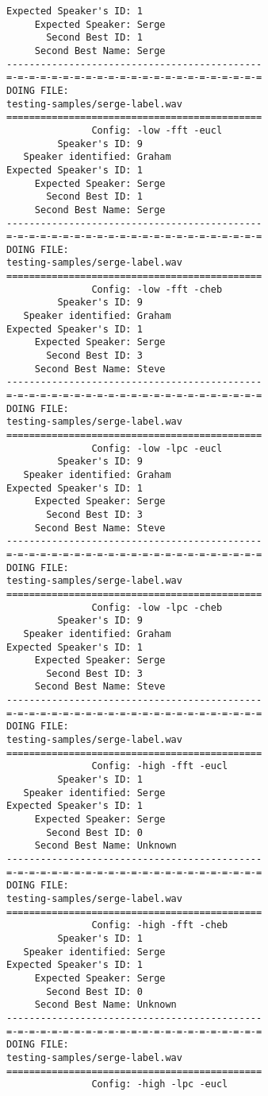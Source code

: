 \begin{verbatim}
Expected Speaker's ID: 1
     Expected Speaker: Serge
       Second Best ID: 1
     Second Best Name: Serge
---------------------------------------------
=-=-=-=-=-=-=-=-=-=-=-=-=-=-=-=-=-=-=-=-=-=-=
DOING FILE:
testing-samples/serge-label.wav
=============================================
               Config: -low -fft -eucl
         Speaker's ID: 9
   Speaker identified: Graham
Expected Speaker's ID: 1
     Expected Speaker: Serge
       Second Best ID: 1
     Second Best Name: Serge
---------------------------------------------
=-=-=-=-=-=-=-=-=-=-=-=-=-=-=-=-=-=-=-=-=-=-=
DOING FILE:
testing-samples/serge-label.wav
=============================================
               Config: -low -fft -cheb
         Speaker's ID: 9
   Speaker identified: Graham
Expected Speaker's ID: 1
     Expected Speaker: Serge
       Second Best ID: 3
     Second Best Name: Steve
---------------------------------------------
=-=-=-=-=-=-=-=-=-=-=-=-=-=-=-=-=-=-=-=-=-=-=
DOING FILE:
testing-samples/serge-label.wav
=============================================
               Config: -low -lpc -eucl
         Speaker's ID: 9
   Speaker identified: Graham
Expected Speaker's ID: 1
     Expected Speaker: Serge
       Second Best ID: 3
     Second Best Name: Steve
---------------------------------------------
=-=-=-=-=-=-=-=-=-=-=-=-=-=-=-=-=-=-=-=-=-=-=
DOING FILE:
testing-samples/serge-label.wav
=============================================
               Config: -low -lpc -cheb
         Speaker's ID: 9
   Speaker identified: Graham
Expected Speaker's ID: 1
     Expected Speaker: Serge
       Second Best ID: 3
     Second Best Name: Steve
---------------------------------------------
=-=-=-=-=-=-=-=-=-=-=-=-=-=-=-=-=-=-=-=-=-=-=
DOING FILE:
testing-samples/serge-label.wav
=============================================
               Config: -high -fft -eucl
         Speaker's ID: 1
   Speaker identified: Serge
Expected Speaker's ID: 1
     Expected Speaker: Serge
       Second Best ID: 0
     Second Best Name: Unknown
---------------------------------------------
=-=-=-=-=-=-=-=-=-=-=-=-=-=-=-=-=-=-=-=-=-=-=
DOING FILE:
testing-samples/serge-label.wav
=============================================
               Config: -high -fft -cheb
         Speaker's ID: 1
   Speaker identified: Serge
Expected Speaker's ID: 1
     Expected Speaker: Serge
       Second Best ID: 0
     Second Best Name: Unknown
---------------------------------------------
=-=-=-=-=-=-=-=-=-=-=-=-=-=-=-=-=-=-=-=-=-=-=
DOING FILE:
testing-samples/serge-label.wav
=============================================
               Config: -high -lpc -eucl

\end{verbatim}
